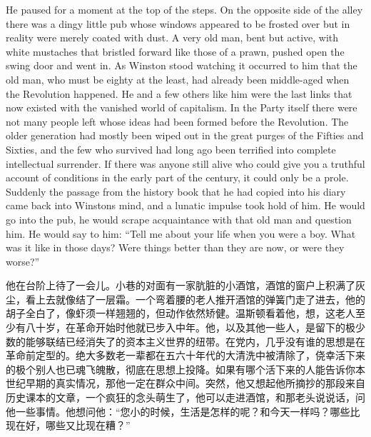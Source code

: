 \begin{paracol}{2}
He paused for a moment at the top of the steps. On the opposite side of
the alley there was a dingy little pub whose windows appeared to be
frosted over but in reality were merely coated with dust. A very old
man, bent but active, with white mustaches that bristled forward like
those of a prawn, pushed open the swing door and went in. As Winston
stood watching it occurred to him that the old man, who must be eighty
at the least, had already been middle-aged when the Revolution happened.
He and a few others like him were the last links that now existed with
the vanished world of capitalism. In the Party itself there were not
many people left whose ideas had been formed before the Revolution. The
older generation had mostly been wiped out in the great purges of the
Fifties and Sixties, and the few who survived had long ago been
terrified into complete intellectual surrender. If there was anyone
still alive who could give you a truthful account of conditions in the
early part of the century, it could only be a prole. Suddenly the
passage from the history book that he had copied into his diary came
back into Winston\textquotesingle s mind, and a lunatic impulse took
hold of him. He would go into the pub, he would scrape acquaintance with
that old man and question him. He would say to him: ``Tell me about your
life when you were a boy. What was it like in those days? Were things
better than they are now, or were they worse?''

\switchcolumn

他在台阶上待了一会儿。小巷的对面有一家肮脏的小酒馆，酒馆的窗户上积满了灰尘，看上去就像结了一层霜。一个弯着腰的老人推开酒馆的弹簧门走了进去，他的胡子全白了，像虾须一样翘翘的，但动作依然矫健。温斯顿看着他，想，这老人至少有八十岁，在革命开始时他就已步入中年。他，以及其他一些人，是留下的极少数的能够联结已经消失了的资本主义世界的纽带。在党内，几乎没有谁的思想是在革命前定型的。绝大多数老一辈都在五六十年代的大清洗中被清除了，侥幸活下来的极个别人也已魂飞魄散，彻底在思想上投降。如果有哪个活下来的人能告诉你本世纪早期的真实情况，那他一定在群众中间。突然，他又想起他所摘抄的那段来自历史课本的文章，一个疯狂的念头萌生了，他可以走进酒馆，和那老头说说话，问他一些事情。他想问他：``您小的时候，生活是怎样的呢？和今天一样吗？哪些比现在好，哪些又比现在糟？''

\switchcolumn*


\end{paracol}
